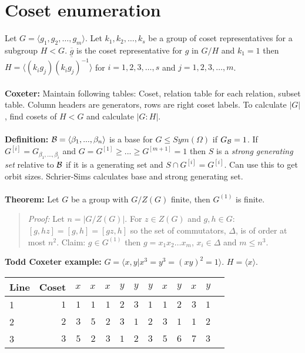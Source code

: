 \section {Coset enumeration}
Let $G= \langle g_1 , g_2 , \ldots , g_m \rangle $.  Let $k_1 , k_2 , \ldots ,
k_s$ be a group of coset representatives for a subgroup $H < G$. ${\overline g}$
is the coset representative for $g$ in $G/H$ and $k_1 = 1$ then
$H= \langle (k_i g_j ) {\overline {(k_i g_j )^{-1}}} \rangle $
for $i= 1, 2, 3, \ldots , s$ and
$j= 1, 2, 3, \ldots , m$.
\\
\\
{\bf Coxeter:}
Maintain following tables: Coset, relation table
for each relation, subset table.  Column headers are generators, rows are
right coset labels.
To calculate $|G|$, find cosets of $H<G$ and calculate $|G:H|$.
\\
\\
{\bf Definition:}
${\cal B}= \langle \beta_1 , ... , \beta_n \rangle $ is a base for 
$G \le Sym(\Omega)$ if $G_{\cal B} = 1$.
If $G^{[i]} = G_{\beta_1 , ..., \beta_i}$ and
$G=G^{[1]} \ge ... \ge G^{[m+1]}=1$ then
$S$ is a \emph{strong generating set} relative to ${\cal B}$ if
it is a generating set and $S \cap G^{[i]} = G^{[i]}$.  Can use this to get
orbit sizes.
Schrier-Sims calculates base and strong generating set.\\
\\
{\bf Theorem:}
Let $G$ be a group with $G/Z(G)$ finite, then $G^{(1)}$ is finite.
\begin{quote}
\emph{Proof:}
Let $n= |G/Z(G)|$.  For $z \in Z(G)$ and $g,h \in G$: $[g,hz]=[g,h]=[gz,h]$ so the 
set of commutators, $\Delta$, is of order at most $n^2$.
Claim: $g \in G^{(1)}$ then $g= x_1 x_2 \ldots x_m$, $x_i \in \Delta$ and
$m \le n^3$.
\end{quote}
{\bf Todd Coxeter example:} $G= \langle x,y| x^3=y^3=(xy)^2=1 \rangle $.  $H= \langle x \rangle $.
\begin{center}
\begin{tabular} {|l||r|r|r|r||r|r|r||r|r|r|r|r|}
\hline
Line & Coset & $x$ & $x$ & $x$ & $y$ & $y$ & $y$ & $x$ & $y$ & $x$ & $y$\\
\hline
1 & $1$ & $1$ & $1$ & $1$ & $2$ & $3$ & $1$ & $1$ & $2$ & $3$ & $1$\\
\hline
2 & $2$ & $3$ & $5$ & $2$ & $3$ & $1$ & $2$ & $3$ & $1$ & $1$ & $2$\\
\hline
3 & $3$ & $5$ & $2$ & $3$ & $1$ & $2$ & $3$ & $5$ & $6$ & $7$ & $3$\\
\hline
\end{tabular}
\end{center}
